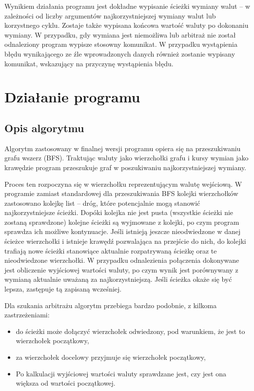 \documentclass[a4paper,12pt]{article}
\newcommand\tab[1][0.6cm]{\hspace*{#1}}
\begin{document}
Wynikiem działania programu jest dokładne wypisanie ścieżki wymiany walut -- w zależności od liczby argumentów najkorzystniejszej wymiany walut lub korzystnego cyklu. Zostaje także wypisana końcowa wartość waluty po dokonaniu wymiany. W przypadku, gdy wymiana jest niemożliwa lub arbitraż nie został odnaleziony program wypisze stosowny komunikat. W przypadku wystąpienia błędu wynikającego ze źle wprowadzonych danych również zostanie wypisany komunikat, wskazujący na przyczynę wystąpienia błędu.

\newpage
\section{Działanie programu}

\subsection{Opis algorytmu}

\tab Algorytm zastosowany w finalnej wersji programu opiera się na przeszukiwaniu grafu wszerz (BFS). Traktując waluty jako wierzchołki grafu i kursy wymian jako krawędzie program przeszukuje graf w poszukiwaniu najkorzystniejszej wymiany. 

Proces ten rozpoczyna się w wierzchołku reprezentującym walutę wejściową. W programie zamiast standardowej dla przeszukiwania BFS kolejki wierzchołków zastosowano kolejkę list -- dróg, które potencjalnie mogą stanowić najkorzystniejsze ścieżki. Dopóki kolejka nie jest pusta (wszystkie ścieżki nie zostaną sprawdzone) kolejne ścieżki są wyjmowane z kolejki, po czym program sprawdza ich możliwe kontynuacje. Jeśli istnieją jeszcze nieodwiedzone w danej ścieżce wierzchołki i istnieje krawędź pozwalająca na przejście do nich, do kolejki trafiają nowe ścieżki stanowiące aktualnie rozpatrywaną ścieżkę oraz te nieodwiedzone wierzchołki. W przypadku odnalezienia połączenia dokonywane jest obliczenie wyjściowej wartości waluty, po czym wynik jest porównywany z wymianą aktualnie uważaną za najkorzystniejszą. Jeśli ścieżka okaże się być lepsza, zastępuje tą zapisaną wcześniej.

Dla szukania arbitrażu algorytm przebiega bardzo podobnie, z kilkoma zastrzeżeniami:

\begin{itemize}

\item do ścieżki może dołączyć wierzchołek odwiedzony, pod warunkiem, że jest to wierzchołek początkowy,

\item za wierzchołek docelowy przyjmuje się wierzchołek początkowy,

\item Po kalkulacji wyjściowej wartości waluty sprawdzane jest, czy jest ona większa od wartości początkowej.

\end{itemize}
\end{document}
